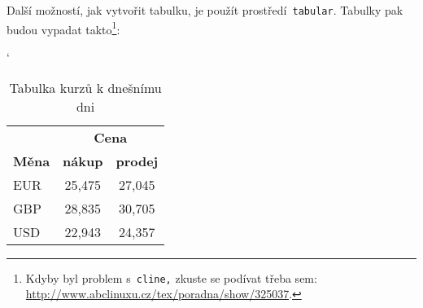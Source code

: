 \documentclass[a4paper, 11pt]{article}
\begin{document}
Další možností, jak vytvořit tabulku, je použít prostředí\texttt{ tabular}. Tabulky pak budou vypadat takto\footnote{Kdyby byl problem s\texttt{ cline,} zkuste se podívat třeba sem: \url{http://www.abclinuxu.cz/tex/poradna/show/325037}.}:

\bigskip
\begin{table}[h!]
\catcode`
\centering
\begin{tabular}{|l|c|c|}
\hline
 & \multicolumn{2}{c|}{\textbf{Cena}}\\ \cline{2-3}
\textbf{Měna} & \textbf{nákup} & \textbf{prodej} \\ \hline
EUR & 25,475 & 27,045\\
GBP & 28,835 & 30,705\\
USD & 22,943 & 24,357\\
\hline
\end{tabular}
\caption{Tabulka kurzů k dnešnímu dni}
\label{tab:kurz}
\end{table}
\end{document}
